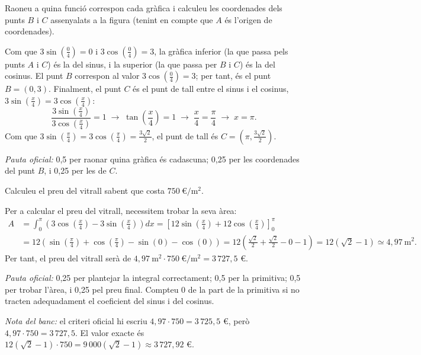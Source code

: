\begin{apartats}

Raoneu a quina funció correspon cada gràfica i calculeu les coordenades dels punts $B$ i $C$ assenyalats a la
figura (tenint en compte que $A$ és l'origen de coordenades).

\begin{solucio}
Com que $3\sin\left(\frac04\right)=0$ i $3\cos\left(\frac04\right)=3$, la gràfica inferior (la que passa pels
punts $A$ i $C$) és la del sinus, i la superior (la que passa per $B$ i $C$) és la del cosinus. El punt $B$
correspon al valor $3\cos\left(\frac04\right)=3$; per tant, és el punt $B=(0,3)$. Finalment, el punt $C$ és el
punt de tall entre el sinus i el cosinus, $3\sin\left(\frac x4\right)=3\cos\left(\frac x4\right)$:
\[
\frac{3\sin\left(\frac x4\right)}{3\cos\left(\frac x4\right)}=1\;\rightarrow\;\tan\left(\frac x4\right)=1
\;\rightarrow\;\frac x4=\frac\pi4\;\rightarrow\;x=\pi .
\]
Com que $3\sin\left(\frac\pi4\right)=3\cos\left(\frac\pi4\right)=\frac{3\sqrt2}{2}$, el punt de tall és
$C=\left(\pi,\frac{3\sqrt2}{2}\right)$.

\textit{Pauta oficial:} 0,5 per raonar quina gràfica és cadascuna; 0,25 per les coordenades del punt $B$, i
0,25 per les de $C$.
\end{solucio}

Calculeu el preu del vitrall sabent que costa $750\ \text{€}/\text{m}^2$.

\begin{solucio}
Per a calcular el preu del vitrall, necessitem trobar la seva àrea:
\begin{align*}
A&=\int_0^\pi\left(3\cos\left(\frac x4\right)-3\sin\left(\frac x4\right)\right)dx
=\left[12\sin\left(\frac x4\right)+12\cos\left(\frac x4\right)\right]_0^\pi\\
&=12\left(\sin\left(\frac\pi4\right)+\cos\left(\frac\pi4\right)-\sin(0)-\cos(0)\right)
=12\left(\frac{\sqrt2}{2}+\frac{\sqrt2}{2}-0-1\right)=12\left(\sqrt2-1\right)\simeq4{,}97\ \text{m}^2 .
\end{align*}
Per tant, el preu del vitrall serà de $4{,}97\ \text{m}^2\cdot750\ \text{€}/\text{m}^2=3\,727{,}5$ €.

\textit{Pauta oficial:} 0,25 per plantejar la integral correctament; 0,5 per la primitiva; 0,5 per trobar
l'àrea, i 0,25 pel preu final. Compteu 0 de la part de la primitiva si no tracten adequadament el coeficient
del sinus i del cosinus.

\textit{Nota del banc:} el criteri oficial hi escriu $4{,}97\cdot750=3\,725{,}5$ €, però
$4{,}97\cdot750=3\,727{,}5$. El valor exacte és $12\left(\sqrt2-1\right)\cdot750=9\,000\left(\sqrt2-1\right)\approx3\,727{,}92$ €.
\end{solucio}

\end{apartats}
